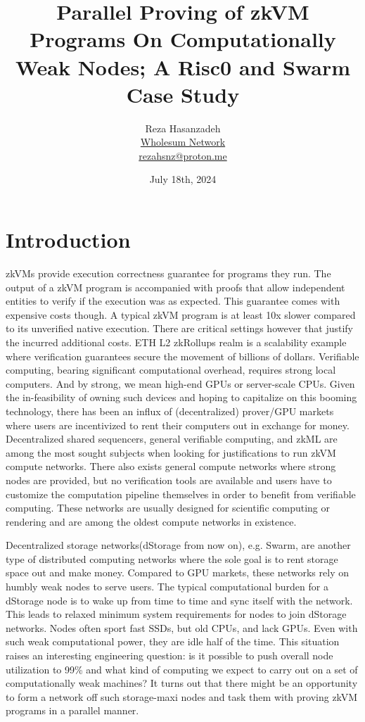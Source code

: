 \documentclass[a4paper, 10pt]{article}
\begin{document}
\title{Parallel Proving of zkVM Programs On Computationally Weak Nodes; A Risc0 and Swarm Case Study}
\author{
	\small{Reza Hasanzadeh}\\
	\footnotesize{\href{https://github.com/WholesumNet}{Wholesum Network}}\\	
	\href{mailto:rezahsnz@proton.me}{\footnotesize{rezahsnz@proton.me}}
}
\date{\footnotesize{July 18th, 2024}}
\maketitle

\section{Introduction}
zkVMs provide execution correctness guarantee for programs they run. The output of a zkVM program is accompanied with proofs that allow independent entities to verify if the execution was as expected. This guarantee comes with expensive costs though. A typical zkVM program is at least 10x slower compared to its unverified native execution. There are critical settings however that justify the incurred additional costs. ETH L2 zkRollups realm is a scalability example where verification guarantees secure the movement of billions of dollars. Verifiable computing, bearing significant computational overhead, requires strong local computers. And by strong, we mean high-end GPUs or server-scale CPUs. Given the in-feasibility of owning such devices and hoping to capitalize on this booming technology, there has been an influx of (decentralized) prover/GPU markets where users are incentivized to rent their computers out in exchange for money. Decentralized shared sequencers, general verifiable computing, and zkML are among the most sought subjects when looking for justifications to run zkVM compute networks. There also exists general compute networks where strong nodes are provided, but no verification tools are available and users have to customize the computation pipeline themselves in order to benefit from verifiable computing. These networks are usually designed for scientific computing or rendering and are among the oldest compute networks in existence.
\par
Decentralized storage networks(dStorage from now on), e.g. Swarm, are another type of distributed computing networks where the sole goal is to rent storage space out and make money. Compared to GPU markets, these networks rely on humbly weak nodes to serve users. The typical computational burden for a dStorage node is to wake up from time to time and sync itself with the network. This leads to relaxed minimum system requirements for nodes to join dStorage networks. Nodes often sport fast SSDs, but old CPUs, and lack GPUs. Even with such weak computational power, they are idle half of the time. This situation raises an interesting engineering question: is it possible to push overall node utilization to 99\% and what kind of computing we expect to carry out on a set of computationally weak machines? It turns out that there might be an opportunity to form a network off such storage-maxi nodes and task them with proving zkVM programs in a parallel manner.
\end{document}
